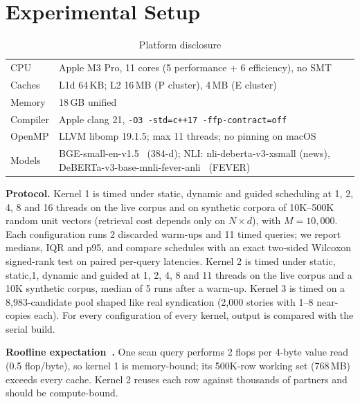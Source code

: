 \documentclass[conference,a4paper]{IEEEtran}
\begin{document}
\section{Experimental Setup}
\label{sec:setup}

\begin{table}[!t]
\caption{Platform disclosure}
\label{tab:platform}
\centering\footnotesize
\setlength{\tabcolsep}{3pt}
\begin{tabularx}{\columnwidth}{lY}
\toprule
CPU & Apple M3 Pro, 11 cores (5 performance + 6 efficiency), no SMT\\
Caches & L1d 64\,KB; L2 16\,MB (P cluster), 4\,MB (E cluster)\\
Memory & 18\,GB unified\\
Compiler & Apple clang 21, \texttt{-O3 -std=c++17 -ffp-contract=off}\\
OpenMP & LLVM libomp 19.1.5; max 11 threads; no pinning on macOS\\
Models & BGE-small-en-v1.5~\cite{bge} (384-d); NLI: nli-deberta-v3-xsmall (news), DeBERTa-v3-base-mnli-fever-anli~\cite{laurer} (FEVER)\\
\bottomrule
\end{tabularx}
\end{table}

\textbf{Protocol.} Kernel 1 is timed under static, dynamic and guided scheduling at 1, 2, 4, 8 and 16 threads on the
live corpus and on synthetic corpora of 10K--500K random unit vectors (retrieval cost depends only on $N\times d$),
with $M=10{,}000$. Each configuration runs 2 discarded warm-ups and 11 timed queries; we report medians, IQR and p95,
and compare schedules with an exact two-sided Wilcoxon signed-rank test on paired per-query latencies. Kernel 2 is
timed under static, static,1, dynamic and guided at 1, 2, 4, 8 and 11 threads on the live corpus and a 10K synthetic
corpus, median of 5 runs after a warm-up. Kernel 3 is timed on a 8,983-candidate pool shaped like real syndication
(2,000 stories with 1--8 near-copies each). For every configuration of every kernel, output is compared with the
serial build.

\textbf{Roofline expectation~\cite{roofline}.} One scan query performs 2 flops per 4-byte value read (0.5 flop/byte), so kernel 1 is
memory-bound; its 500K-row working set (768\,MB) exceeds every cache. Kernel 2 reuses each row against thousands of
partners and should be compute-bound.
\end{document}
